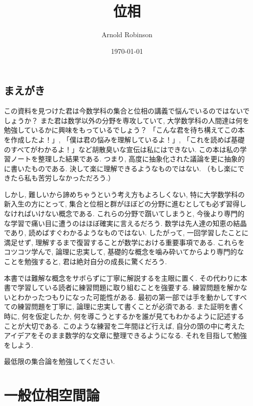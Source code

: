 \documentclass[lualatex]{ltjsbook}
\theoremstyle{remark}
\theoremstyle{plain}
\begin{document}
\title{位相}
\author{Arnold Robinson}
\date{\today}
\maketitle

\chapter*{まえがき}

この資料を見つけた君は今数学科の集合と位相の講義で悩んでいるのではないでしょうか？
また君は数学以外の分野を専攻していて, 大学数学科の人間達は何を勉強しているかに興味をもっているでしょう？ 
「こんな君を待ち構えてこの本を作成したよ！」, 「僕は君の悩みを理解しているよ！」, 「これを読めば基礎のすべてがわかるよ！」など胡散臭いな宣伝は私にはできない. 
この本は私の学習ノートを整理した結果である. つまり, 高度に抽象化された議論を更に抽象的に書いたものである. 決して楽に理解できるようなものではない. （もし楽にできたら私も苦労しなかっただろう.）



しかし, 難しいから諦めちゃうという考え方もよろしくない, 特に大学数学科の新入生の方にとって, 集合と位相と群がほぼどの分野に進むとしても必ず習得しなければいけない概念である. これらの分野で躓いてしまうと,
今後より専門的な学習で痛い目に遭うのはほぼ確実に言えるだろう. 
数学は先人達の知恵の結晶であり, 読めばすぐわかるようなものではない. したがって, 一回学習したことに満足せず, 理解するまで復習することが数学における重要事項である. これらをコツコツ学んで, 論理に忠実して, 基礎的な概念を噛み砕いてからより専門的なことを勉強すると, 君は絶対自分の成長に驚くだろう.



本書では難解な概念をサボらずに丁寧に解説するを主眼に置く. その代わりに本書で学習している読者に練習問題に取り組むことを強要する. 練習問題を解かないとわかったつもりになった可能性がある. 最初の第一部では手を動かしてすべての練習問題を丁寧に, 論理に忠実して書くことが必須である. また証明を書く時に, 何を仮定したか, 何を導こうとするかを誰が見てもわかるように記述することが大切である. このような練習を二年間ほど行えば, 自分の頭の中に考えたアイデアをそのまま数学的な文章に整理できるようになる. それを目指して勉強をしよう.

最低限の集合論を勉強してください. 


\tableofcontents
{}





\part{一般位相空間論}
\end{document}
